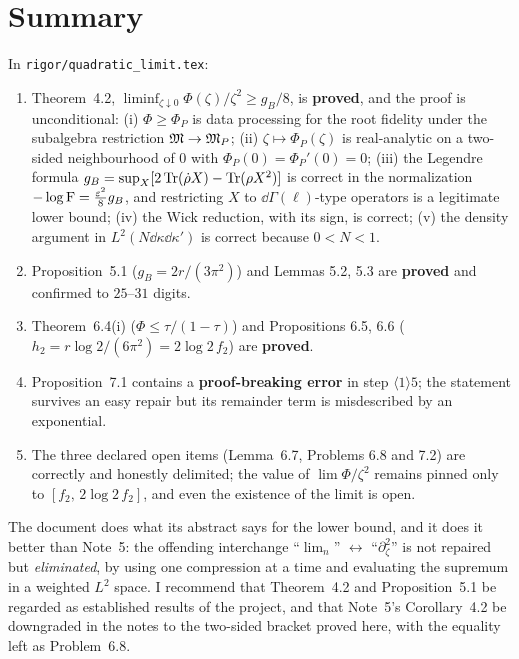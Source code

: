 \documentclass[11pt]{article}
\theoremstyle{definition}\newtheorem{problem}[theorem]{Problem}
\begin{document}
\section{Summary}\label{sec:sum}

\begin{theorem}\label{thm:v7}
In \texttt{rigor/quadratic\_limit.tex}:
\begin{enumerate}[label=(\alph*),leftmargin=2em]
\item Theorem~4.2, \(\liminf_{\zeta\downarrow0}\Phi(\zeta)/\zeta^2\ge g_B/8\), is \textbf{proved}, and
 the proof is unconditional: (i) \(\Phi\ge\Phi_P\) is data processing for the root fidelity under
 the subalgebra restriction \(\mathfrak M\to\mathfrak M_P\); (ii) \(\zeta\mapsto\Phi_P(\zeta)\) is real-analytic on
 a two-sided neighbourhood of \(0\) with \(\Phi_P(0)=\Phi_P'(0)=0\); (iii) the Legendre formula
 \(g_B=\sup_X[2\operatorname{Tr}(\dot\rho X)-\operatorname{Tr}(\rho X^2)]\) is correct in the normalization
 \(-\log\operatorname{F}=\frac{\varepsilon^2}8g_B\), and restricting \(X\) to \(\dd\Gamma(\ell)\)-type operators is a
 legitimate lower bound; (iv) the Wick reduction, with its sign, is correct; (v) the density
 argument in \(L^2(N\dd\kappa\dd\kappa')\) is correct because \(0<N<1\).
\item Proposition~5.1 (\(g_B=2r/(3\pi^2)\)) and Lemmas 5.2, 5.3 are \textbf{proved} and confirmed to
 \(25\)--\(31\) digits.
\item Theorem~6.4(i) (\(\Phi\le\tau/(1-\tau)\)) and Propositions 6.5, 6.6
 (\(h_2=r\log2/(6\pi^2)=2\log2\,f_2\)) are \textbf{proved}.
\item Proposition~7.1 contains a \textbf{proof-breaking error} in step \(\langle1\rangle5\); the
 statement survives an easy repair but its remainder term is misdescribed by an exponential.
\item The three declared open items (Lemma~6.7, Problems 6.8 and 7.2) are correctly and honestly
 delimited; the value of \(\lim\Phi/\zeta^2\) remains pinned only to \([f_2,\,2\log2\,f_2]\), and
 even the existence of the limit is open.
\end{enumerate}
\end{theorem}

\begin{verdictok}
The document does what its abstract says for the lower bound, and it does it better than Note~5:
the offending interchange ``\(\lim_n\)'' \(\leftrightarrow\) ``\(\partial_\zeta^2\)'' is not
repaired but \emph{eliminated}, by using one compression at a time and evaluating the supremum in a
weighted \(L^2\) space.  I recommend that Theorem~4.2 and Proposition~5.1 be regarded as
established results of the project, and that Note~5's Corollary~4.2 be downgraded in the notes to
the two-sided bracket proved here, with the equality left as Problem~6.8.
\end{verdictok}
\end{document}
